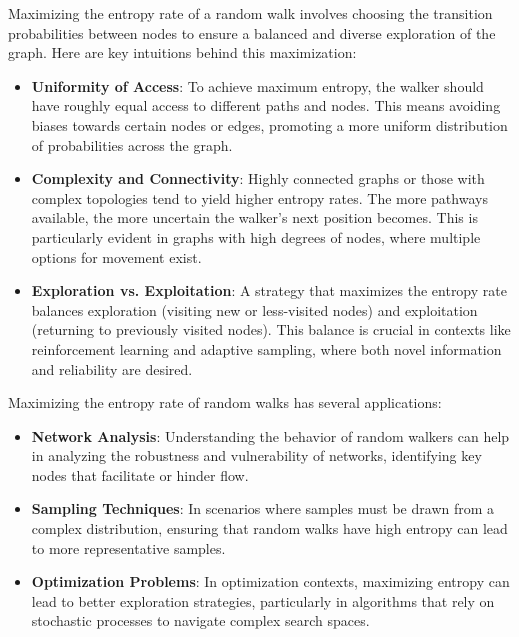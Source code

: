 Maximizing the entropy rate of a random walk involves choosing the transition probabilities between nodes to ensure a balanced and diverse exploration of the graph. Here are key intuitions behind this maximization:

\begin{itemize}
	\item \textbf{Uniformity of Access}: To achieve maximum entropy, the walker should have roughly equal access to different paths and nodes. This means avoiding biases towards certain nodes or edges, promoting a more uniform distribution of probabilities across the graph.
	
	\item \textbf{Complexity and Connectivity}: Highly connected graphs or those with complex topologies tend to yield higher entropy rates. The more pathways available, the more uncertain the walker’s next position becomes. This is particularly evident in graphs with high degrees of nodes, where multiple options for movement exist.
	
	\item \textbf{Exploration vs. Exploitation}: A strategy that maximizes the entropy rate balances exploration (visiting new or less-visited nodes) and exploitation (returning to previously visited nodes). This balance is crucial in contexts like reinforcement learning and adaptive sampling, where both novel information and reliability are desired.
\end{itemize}


Maximizing the entropy rate of random walks has several applications:

\begin{itemize}
	\item \textbf{Network Analysis}: Understanding the behavior of random walkers can help in analyzing the robustness and vulnerability of networks, identifying key nodes that facilitate or hinder flow.
	
	\item \textbf{Sampling Techniques}: In scenarios where samples must be drawn from a complex distribution, ensuring that random walks have high entropy can lead to more representative samples.
	
	\item \textbf{Optimization Problems}: In optimization contexts, maximizing entropy can lead to better exploration strategies, particularly in algorithms that rely on stochastic processes to navigate complex search spaces.
\end{itemize}

